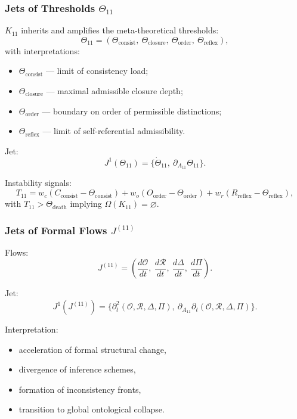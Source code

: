 \subsubsection{Jets of Thresholds $\Theta_{11}$}

$K_{11}$ inherits and amplifies the meta-theoretical thresholds:
\[
\Theta_{11}
=
(\Theta_{\mathrm{consist}},\
 \Theta_{\mathrm{closure}},\
 \Theta_{\mathrm{order}},\
 \Theta_{\mathrm{reflex}}),
\]
with interpretations:
\begin{itemize}
    \item $\Theta_{\mathrm{consist}}$ — limit of consistency load;
    \item $\Theta_{\mathrm{closure}}$ — maximal admissible closure depth;
    \item $\Theta_{\mathrm{order}}$ — boundary on order of permissible distinctions;
    \item $\Theta_{\mathrm{reflex}}$ — limit of self-referential admissibility.
\end{itemize}

Jet:
\[
J^1(\Theta_{11})
=
\{\dot{\Theta}_{11},\ \partial_{A_{11}}\Theta_{11}\}.
\]

Instability signals:
\[
T_{11}
=
w_c (C_{\mathrm{consist}}-\Theta_{\mathrm{consist}})
+
w_o (O_{\mathrm{order}}-\Theta_{\mathrm{order}})
+
w_r (R_{\mathrm{reflex}}-\Theta_{\mathrm{reflex}}),
\]
with $T_{11}>\Theta_{\mathrm{death}}$ implying
$\Omega(K_{11})=\varnothing$.


\subsubsection{Jets of Formal Flows $J^{(11)}$}

Flows:
\[
J^{(11)}
=
\left(
\frac{d\mathcal{O}}{dt},\
\frac{d\mathcal{R}}{dt},\
\frac{d\Delta}{dt},\
\frac{d\Pi}{dt}
\right).
\]

Jet:
\[
J^1(J^{(11)})
=
\big\{
\partial_t^2(\mathcal{O},\mathcal{R},\Delta,\Pi),\
\partial_{A_{11}}\partial_t(\mathcal{O},\mathcal{R},\Delta,\Pi)
\big\}.
\]

Interpretation:
\begin{itemize}
    \item acceleration of formal structural change,
    \item divergence of inference schemes,
    \item formation of inconsistency fronts,
    \item transition to global ontological collapse.
\end{itemize}


